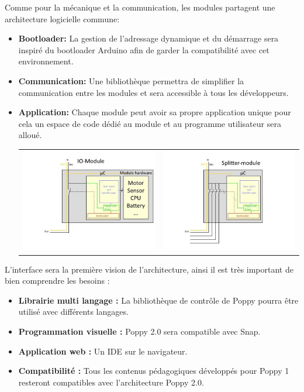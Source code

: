 \documentclass[a0,final, portrait]{inriaposter}
\begin{document}
\begin{multicols}{2}
{Comme pour la mécanique et la communication, les modules partagent une architecture logicielle commune:
\begin{itemize}
    \item \textbf{Bootloader:} La gestion de l'adressage dynamique et du démarrage sera inspiré du bootloader Arduino afin de garder la compatibilité avec cet environnement.
    \item \textbf{Communication:} Une bibliothèque permettra de simplifier la communication entre les modules et sera accessible à tous les développeurs.
    \item \textbf{Application:} Chaque module peut avoir sa propre application unique pour cela un espace de code dédié au module et au programme utilisateur sera alloué.
    \begin{tabular}{cc}
        \includegraphics[width=0.45\columnwidth]{images/modul_arch.jpg} &
        \includegraphics[width=0.45\columnwidth]{images/splitter_arch.jpg}
    \end{tabular}
\end{itemize}
}

 {

L'interface sera la première vision de l'architecture, ainsi il est très important de bien comprendre les besoins :
\begin{itemize}
    \item \textbf{Librairie multi langage :} La bibliothèque de contrôle de Poppy pourra être utilisé avec différents langages.
    \item \textbf{Programmation visuelle :} Poppy 2.0 sera compatible avec Snap.
    \item \textbf{Application web :} Un IDE sur le navigateur.
    \item \textbf{Compatibilité :} Tous les contenus pédagogiques développés pour Poppy 1 resteront compatibles avec l'architecture Poppy 2.0.
\end{itemize}
}



\end{multicols}
\end{document}
